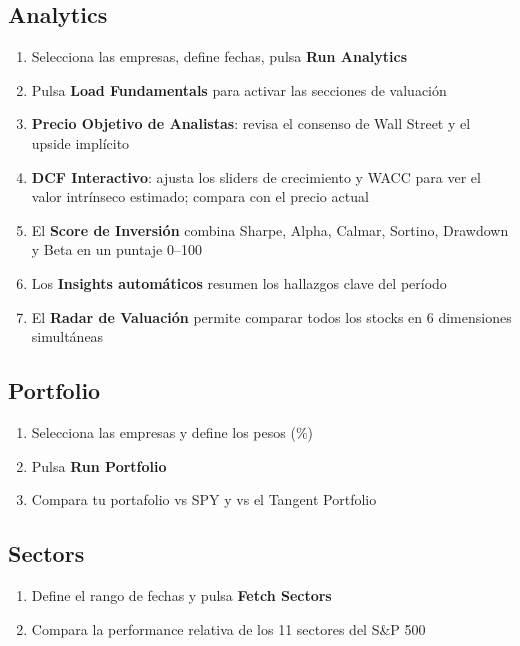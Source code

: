 \documentclass[11pt, a4paper]{article}
\begin{document}
\subsection{Analytics}
\begin{enumerate}
  \item Selecciona las empresas, define fechas, pulsa \textbf{Run Analytics}
  \item Pulsa \textbf{Load Fundamentals} para activar las secciones de valuación
  \item \textbf{Precio Objetivo de Analistas}: revisa el consenso de Wall Street y el upside implícito
  \item \textbf{DCF Interactivo}: ajusta los sliders de crecimiento y WACC para ver el valor intrínseco estimado; compara con el precio actual
  \item El \textbf{Score de Inversión} combina Sharpe, Alpha, Calmar, Sortino, Drawdown y Beta en un puntaje 0--100
  \item Los \textbf{Insights automáticos} resumen los hallazgos clave del período
  \item El \textbf{Radar de Valuación} permite comparar todos los stocks en 6 dimensiones simultáneas
\end{enumerate}

\subsection{Portfolio}
\begin{enumerate}
  \item Selecciona las empresas y define los pesos (\%)
  \item Pulsa \textbf{Run Portfolio}
  \item Compara tu portafolio vs SPY y vs el Tangent Portfolio
\end{enumerate}

\subsection{Sectors}
\begin{enumerate}
  \item Define el rango de fechas y pulsa \textbf{Fetch Sectors}
  \item Compara la performance relativa de los 11 sectores del S\&P 500
\end{enumerate}

\newpage

\end{document}
